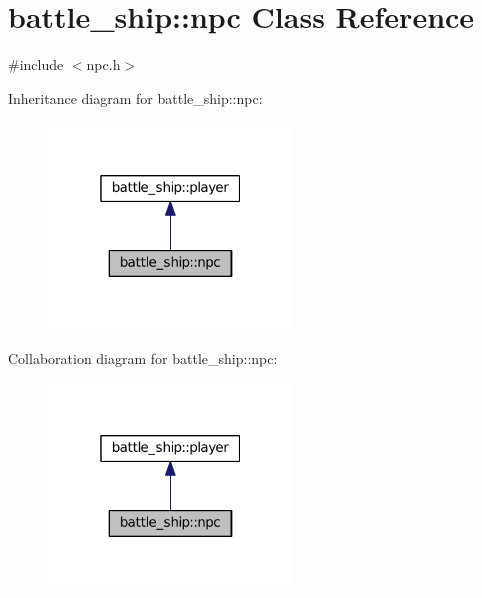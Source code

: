 \hypertarget{classbattle__ship_1_1npc}{}\section{battle\+\_\+ship\+:\+:npc Class Reference}
\label{classbattle__ship_1_1npc}


{\ttfamily \#include $<$npc.\+h$>$}



Inheritance diagram for battle\+\_\+ship\+:\+:npc\+:
\nopagebreak
\begin{figure}[H]
\begin{center}
\leavevmode
\includegraphics[width=184pt]{classbattle__ship_1_1npc__inherit__graph}
\end{center}
\end{figure}


Collaboration diagram for battle\+\_\+ship\+:\+:npc\+:
\nopagebreak
\begin{figure}[H]
\begin{center}
\leavevmode
\includegraphics[width=184pt]{classbattle__ship_1_1npc__coll__graph}
\end{center}
\end{figure}
